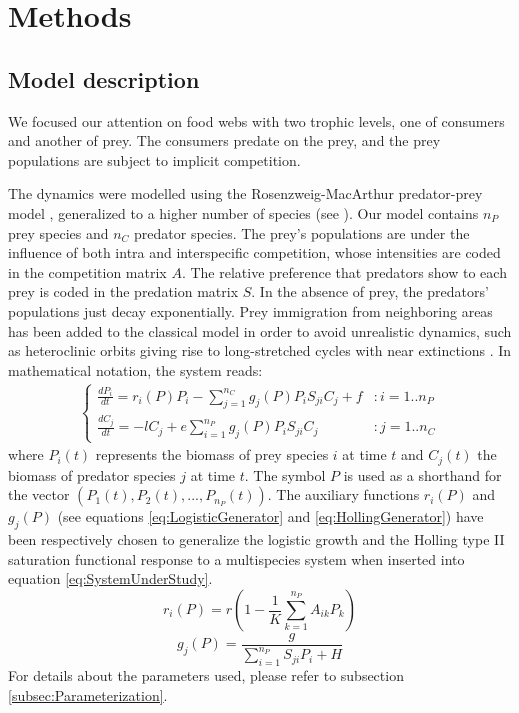\section{Methods}
\label{sec:Methods}

\subsection{Model description}
\label{subsec:Model}

We focused our attention on food webs with two trophic levels, one of consumers and another of prey. The consumers predate on the prey, and the prey populations are subject to implicit competition.

The dynamics were modelled using the Rosenzweig-MacArthur predator-prey model \citep{Rosenzweig1963}, generalized to a higher number of species (see \citet{Scheffer2004}). Our model contains $n_P$ prey species and $n_C$ predator species. The prey's populations are under the influence of both intra and interspecific competition, whose intensities are coded in the competition matrix $A$. The relative preference that predators show to each prey is coded in the predation matrix $S$. In the absence of prey, the predators' populations just decay exponentially. Prey immigration from neighboring areas has been added to the classical model in order to avoid unrealistic dynamics, such as heteroclinic orbits giving rise to long-stretched cycles with near extinctions \citep{Scheffer2004}. In mathematical notation, the system reads:
%
\begin{eqnarray}
\label{eq:SystemUnderStudy}
	\begin{cases}
	\frac{dP_i}{dt} =  r_i(P) P_i  - \sum_{j = 1}^{n_C} g_j(P) P_i S_{ji} C_j + f & : i = 1..n_P
	\\
	\frac{dC_j}{dt} = - l C_j +  e \sum_{i = 1}^{n_P} g_j(P) P_i S_{ji} C_j  & : j = 1..n_C
	\end{cases}
\end{eqnarray}
%
where $P_i(t)$ represents the biomass of prey species $i$ at time $t$ and $C_j(t)$ the biomass of predator species $j$ at time $t$. The symbol $P$ is used as a shorthand for the vector $(P_1(t), P_2(t), ..., P_{n_P}(t))$. The auxiliary functions $r_i(P)$ and $g_j(P)$ (see equations \eqref{eq:LogisticGenerator} and \eqref{eq:HollingGenerator}) have been respectively chosen to generalize the logistic growth and the Holling type II saturation functional response \citep{Edelstein-Keshet} to a multispecies system when inserted into equation \eqref{eq:SystemUnderStudy}.
%
\begin{equation}
\label{eq:LogisticGenerator}
	r_i(P) = r \left( 1 - \frac{1}{K} \sum_{k=1}^{n_P} A_{ik} P_k \right)
\end{equation}
%
\begin{equation}
\label{eq:HollingGenerator}
	g_j(P) = \frac{g}{\sum_{i=1}^{n_P} S_{ji} P_i + H}
\end{equation}
%
For details about the parameters used, please refer to subsection \ref{subsec:Parameterization}.

